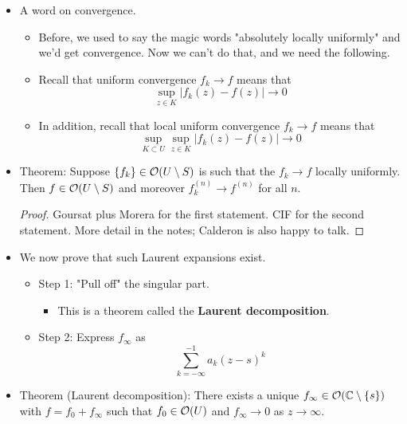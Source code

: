 \documentclass[../notes.tex]{subfiles}
\begin{document}
\begin{itemize}
\begin{enumerate}
\begin{itemize}
\begin{equation*}
            \end{equation*}
        \end{itemize}
    \end{enumerate}
    \item A word on convergence.
    \begin{itemize}
        \item Before, we used to say the magic words "absolutely locally uniformly" and we'd get convergence. Now we can't do that, and we need the following.
        \item Recall that uniform convergence $f_k\to f$ means that
        \begin{equation*}
            \sup_{z\in K}|f_k(z)-f(z)| \to 0
        \end{equation*}
        \item In addition, recall that local uniform convergence $f_k\to f$ means that
        \begin{equation*}
            \sup_{K\subset U}\sup_{z\in K}|f_k(z)-f(z)| \to 0
        \end{equation*}
    \end{itemize}
    \item Theorem: Suppose $\{f_k\}\in\mathcal{O}(U\setminus S)$ is such that the $f_k\to f$ locally uniformly. Then $f\in\mathcal{O}(U\setminus S)$ and moreover $f_k^{(n)}\to f^{(n)}$ for all $n$.
    \begin{proof}
        Goursat plus Morera for the first statement. CIF for the second statement. More detail in the notes; Calderon is also happy to talk.
    \end{proof}
    \item We now prove that such Laurent expansions exist.
    \begin{itemize}
        \item Step 1: "Pull off" the singular part.
        \begin{itemize}
            \item This is a theorem called the \textbf{Laurent decomposition}.
        \end{itemize}
        \item Step 2: Express $f_\infty$ as
        \begin{equation*}
            \sum_{k=-\infty}^{-1}a_k(z-s)^k
        \end{equation*}
    \end{itemize}
    \item Theorem (Laurent decomposition): There exists a unique $f_\infty\in\mathcal{O}(\mathbb{C}\setminus\{s\})$ with $f=f_0+f_\infty$ such that $f_0\in\mathcal{O}(U)$ and $f_\infty\to 0$ as $z\to\infty$.

\end{itemize}
\end{document}
